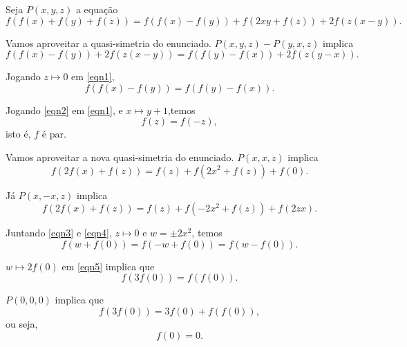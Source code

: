 \documentclass[10pt, a4paper]{article}
\begin{document}

\begin{sol}
	Seja $P(x, y, z)$ a equação  \[
		f(f(x) + f(y) + f(z)) = f(f(x) - f(y)) + f(2xy + f(z)) + 2f(z(x-y)).
	\]

	Vamos aproveitar a quasi-simetria do enunciado. $P(x, y, z) - P(y, x, z)$ implica \begin{equation}\label{eqn1}
		f(f(x) - f(y)) + 2f(z(x-y)) = f(f(y) - f(x)) + 2f(z(y-x)).
	\end{equation}

	Jogando $z \mapsto 0$ em \cref{eqn1}, \begin{equation}\label{eqn2}
		f(f(x) - f(y)) = f(f(y) - f(x)).
	\end{equation}

	Jogando \cref{eqn2} em \cref{eqn1}, e $x \mapsto y + 1$,temos \[
		f(z) = f(-z),
	\]
	isto é, $f$ é par.

	Vamos aproveitar a nova quasi-simetria do enunciado. $P(x, x, z)$ implica \begin{equation}\label{eqn3}
		f(2f(x) + f(z)) = f(z) + f(2x^2 + f(z)) + f(0).
	\end{equation}

	Já $P(x, -x, z)$ implica  \begin{equation}\label{eqn4}
		f(2f(x) + f(z)) = f(z) + f(-2x^2 + f(z)) + f(2zx).
	\end{equation}

	Juntando \cref{eqn3} e \cref{eqn4}, $z \mapsto 0$ e $w = \pm 2x^2$, temos \begin{equation}\label{eqn5}
		f(w + f(0)) = f(-w + f(0)) = f(w - f(0)).
	\end{equation}

	$w \mapsto 2f(0)$ em \cref{eqn5} implica que \[f(3f(0)) = f(f(0)).\]

	$P(0, 0, 0)$ implica que \[
		f(3f(0)) = 3f(0) + f(f(0)),
	\]
	ou seja, \[
		f(0) = 0.
	\]


\end{sol}
\end{document}
